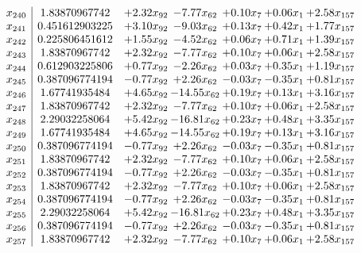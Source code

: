\documentclass[8pt]{article}
\begin{document}
\[\begin{array}{c| c c@{\hskip 2pt} c@{\hskip 2pt} c@{\hskip 2pt} c@{\hskip 2pt} c@{\hskip 2pt} }
 x_{240}   &  1.83870967742 & +  2.32 x_{92} & -7.77 x_{62} & +  0.10 x_{7} & +  0.06 x_{1} & +  2.58 x_{157}\\
 x_{241}   &  0.451612903225 & +  3.10 x_{92} & -9.03 x_{62} & +  0.13 x_{7} & +  0.42 x_{1} & +  1.77 x_{157}\\
 x_{242}   &  0.225806451612 & +  1.55 x_{92} & -4.52 x_{62} & +  0.06 x_{7} & +  0.71 x_{1} & +  1.39 x_{157}\\
 x_{243}   &  1.83870967742 & +  2.32 x_{92} & -7.77 x_{62} & +  0.10 x_{7} & +  0.06 x_{1} & +  2.58 x_{157}\\
 x_{244}   &  0.612903225806 & +  0.77 x_{92} & -2.26 x_{62} & +  0.03 x_{7} & +  0.35 x_{1} & +  1.19 x_{157}\\
 x_{245}   &  0.387096774194 & -0.77 x_{92} & +  2.26 x_{62} & -0.03 x_{7} & -0.35 x_{1} & +  0.81 x_{157}\\
 x_{246}   &  1.67741935484 & +  4.65 x_{92} & -14.55 x_{62} & +  0.19 x_{7} & +  0.13 x_{1} & +  3.16 x_{157}\\
 x_{247}   &  1.83870967742 & +  2.32 x_{92} & -7.77 x_{62} & +  0.10 x_{7} & +  0.06 x_{1} & +  2.58 x_{157}\\
 x_{248}   &  2.29032258064 & +  5.42 x_{92} & -16.81 x_{62} & +  0.23 x_{7} & +  0.48 x_{1} & +  3.35 x_{157}\\
 x_{249}   &  1.67741935484 & +  4.65 x_{92} & -14.55 x_{62} & +  0.19 x_{7} & +  0.13 x_{1} & +  3.16 x_{157}\\
 x_{250}   &  0.387096774194 & -0.77 x_{92} & +  2.26 x_{62} & -0.03 x_{7} & -0.35 x_{1} & +  0.81 x_{157}\\
 x_{251}   &  1.83870967742 & +  2.32 x_{92} & -7.77 x_{62} & +  0.10 x_{7} & +  0.06 x_{1} & +  2.58 x_{157}\\
 x_{252}   &  0.387096774194 & -0.77 x_{92} & +  2.26 x_{62} & -0.03 x_{7} & -0.35 x_{1} & +  0.81 x_{157}\\
 x_{253}   &  1.83870967742 & +  2.32 x_{92} & -7.77 x_{62} & +  0.10 x_{7} & +  0.06 x_{1} & +  2.58 x_{157}\\
 x_{254}   &  0.387096774194 & -0.77 x_{92} & +  2.26 x_{62} & -0.03 x_{7} & -0.35 x_{1} & +  0.81 x_{157}\\
 x_{255}   &  2.29032258064 & +  5.42 x_{92} & -16.81 x_{62} & +  0.23 x_{7} & +  0.48 x_{1} & +  3.35 x_{157}\\
 x_{256}   &  0.387096774194 & -0.77 x_{92} & +  2.26 x_{62} & -0.03 x_{7} & -0.35 x_{1} & +  0.81 x_{157}\\
 x_{257}   &  1.83870967742 & +  2.32 x_{92} & -7.77 x_{62} & +  0.10 x_{7} & +  0.06 x_{1} & +  2.58 x_{157}\\

\end{array}\]
\end{document}
